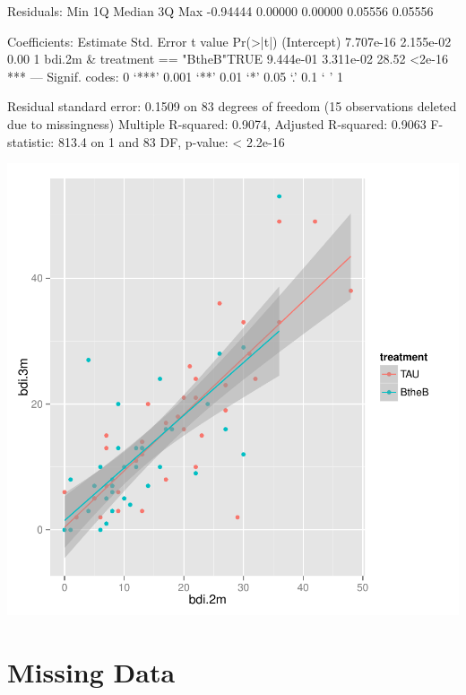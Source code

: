 \documentclass{article}
\begin{document}
\begin{Schunk}
\begin{Soutput}
Residuals:
     Min       1Q   Median       3Q      Max 
-0.94444  0.00000  0.00000  0.05556  0.05556 

Coefficients:
                                   Estimate Std. Error t value Pr(>|t|)    
(Intercept)                       7.707e-16  2.155e-02    0.00        1    
bdi.2m & treatment == "BtheB"TRUE 9.444e-01  3.311e-02   28.52   <2e-16 ***
---
Signif. codes:  0 ‘***’ 0.001 ‘**’ 0.01 ‘*’ 0.05 ‘.’ 0.1 ‘ ’ 1

Residual standard error: 0.1509 on 83 degrees of freedom
  (15 observations deleted due to missingness)
Multiple R-squared:  0.9074,	Adjusted R-squared:  0.9063 
F-statistic: 813.4 on 1 and 83 DF,  p-value: < 2.2e-16
\end{Soutput}
\end{Schunk}
\includegraphics{BtheBteam1-005}



\section{Missing Data}
\end{document}
